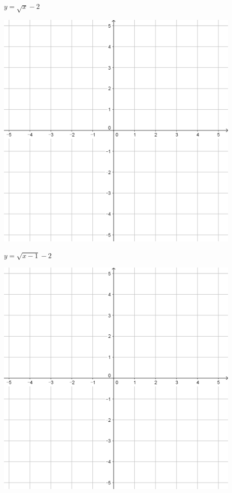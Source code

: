 \documentclass[a4paper]{oblivoir}
\begin{document}
\begin{minipage}{0.45\textwidth}\centering
\(y=\sqrt{x}-2\)
\par\bigskip\includegraphics[width=0.9\textwidth]{55}
\end{minipage}
\begin{minipage}{0.45\textwidth}\centering
\(y=\sqrt{x-1}-2\)
\par\bigskip\includegraphics[width=0.9\textwidth]{55}
\end{minipage}\bigskip\bigskip\par
\end{document}
